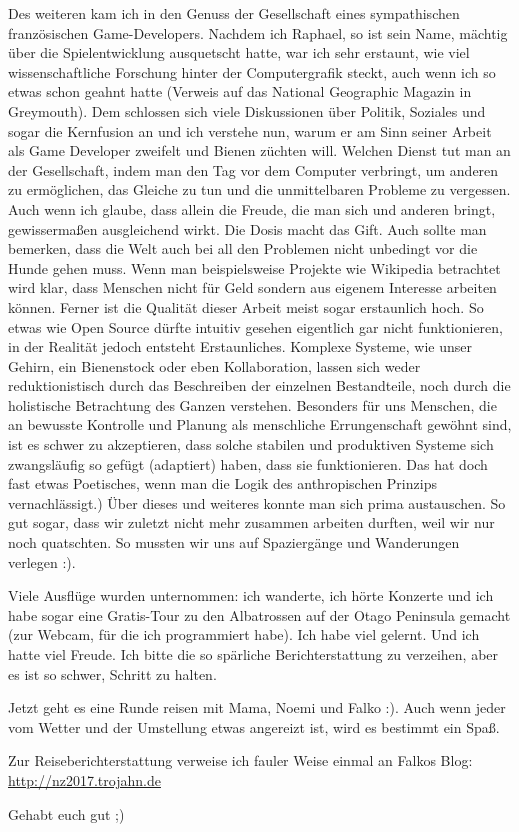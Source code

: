 Des weiteren kam ich in den Genuss der Gesellschaft eines sympathischen
französischen Game-Developers. Nachdem ich Raphael, so ist sein Name,
mächtig über die Spielentwicklung ausquetscht hatte, war ich sehr
erstaunt, wie viel wissenschaftliche Forschung hinter der Computergrafik
steckt, auch wenn ich so etwas schon geahnt hatte (Verweis auf das
National Geographic Magazin in Greymouth). Dem schlossen sich viele
Diskussionen über Politik, Soziales und sogar die Kernfusion an und ich
verstehe nun, warum er am Sinn seiner Arbeit als Game Developer zweifelt
und Bienen züchten will. Welchen Dienst tut man an der Gesellschaft,
indem man den Tag vor dem Computer verbringt, um anderen zu ermöglichen,
das Gleiche zu tun und die unmittelbaren Probleme zu vergessen. Auch
wenn ich glaube, dass allein die Freude, die man sich und anderen
bringt, gewissermaßen ausgleichend wirkt. Die Dosis macht das Gift. Auch
sollte man bemerken, dass die Welt auch bei all den Problemen nicht
unbedingt vor die Hunde gehen muss. Wenn man beispielsweise Projekte wie
Wikipedia betrachtet wird klar, dass Menschen nicht für Geld sondern aus
eigenem Interesse arbeiten können. Ferner ist die Qualität dieser Arbeit
meist sogar erstaunlich hoch. So etwas wie Open Source dürfte intuitiv
gesehen eigentlich gar nicht funktionieren, in der Realität jedoch
entsteht Erstaunliches. Komplexe Systeme, wie unser Gehirn, ein
Bienenstock oder eben Kollaboration, lassen sich weder reduktionistisch
durch das Beschreiben der einzelnen Bestandteile, noch durch die
holistische Betrachtung des Ganzen verstehen. Besonders für uns
Menschen, die an bewusste Kontrolle und Planung als menschliche
Errungenschaft gewöhnt sind, ist es schwer zu akzeptieren, dass solche
stabilen und produktiven Systeme sich zwangsläufig so gefügt (adaptiert)
haben, dass sie funktionieren. Das hat doch fast etwas Poetisches, wenn
man die Logik des anthropischen Prinzips vernachlässigt.) Über dieses
und weiteres konnte man sich prima austauschen. So gut sogar, dass wir
zuletzt nicht mehr zusammen arbeiten durften, weil wir nur noch
quatschten. So mussten wir uns auf Spaziergänge und Wanderungen verlegen
:).

Viele Ausflüge wurden unternommen: ich wanderte, ich hörte Konzerte und
ich habe sogar eine Gratis-Tour zu den Albatrossen auf der Otago
Peninsula gemacht (zur Webcam, für die ich programmiert habe). Ich habe
viel gelernt. Und ich hatte viel Freude. Ich bitte die so spärliche
Berichterstattung zu verzeihen, aber es ist so schwer, Schritt zu
halten.

Jetzt geht es eine Runde reisen mit Mama, Noemi und Falko :). Auch wenn
jeder vom Wetter und der Umstellung etwas angereizt ist, wird es
bestimmt ein Spaß.

Zur Reiseberichterstattung verweise ich fauler Weise einmal an Falkos
Blog: \url{http://nz2017.trojahn.de}

Gehabt euch gut ;)
